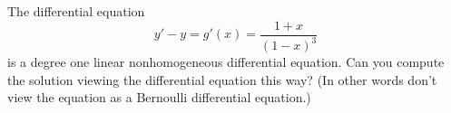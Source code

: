   The differential equation
  \[
  y' - y = g'(x) = \frac{1+x}{(1-x)^3}
  \]
  is a degree one linear nonhomogeneous differential equation.
  Can you compute the solution viewing the differential equation this way?
  (In other words don't view the equation as a Bernoulli differential
  equation.)
